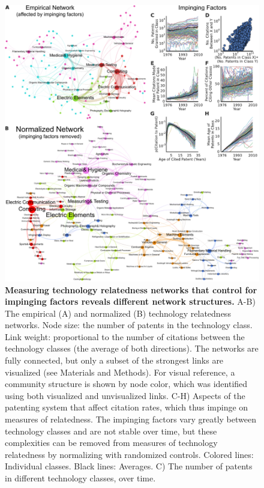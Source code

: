\documentclass[pre,reprint,groupedaddress,superscriptaddress]{revtex4-1}
\begin{document}
\begin{figure}
\begin{center}
\includegraphics[]{figs/Network_and_Impinging_Factors.pdf} 
\end{center}
\caption{\textbf{Measuring technology relatedness networks that control for impinging factors reveals different network structures.} A-B) The empirical (A) and normalized (B) technology relatedness networks. Node size: the number of patents in the technology class. Link weight: proportional to the number of citations between the technology classes (the average of both directions). The networks are fully connected, but only a subset of the strongest links are visualized (see Materials and Methods). For visual reference, a community structure is shown by node color, which was identified using both visualized and unvisualized links. C-H) Aspects of the patenting system that affect citation rates, which thus impinge on measures of relatedness. The impinging factors vary greatly between technology classes and are not stable over time, but these complexities can be removed from measures of technology relatedness by normalizing with randomized controls. Colored lines: Individual classes. Black lines: Averages.
C) The number of patents in different technology classes, over time.
}
\end{figure}
\end{document}
